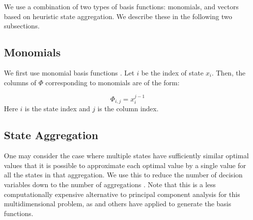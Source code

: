 \documentclass[conference]{IEEEtran}
\begin{document}
We use a combination of two types of basis functions: monomials, and vectors based on heuristic state aggregation. We describe these in the following two subsections.

\subsection{Monomials}
    We first use monomial basis functions \cite{bertsekas1995dynamic,478953}. Let $i$ be the index of state $x_{i}$. Then, the columns of $\Phi$ corresponding to monomials are of the form:
	
	\begin{displaymath}
        \Phi_{i,j}=x_{i}^{j-1}
    \end{displaymath} Here $i$ is the state index and $j$ is the column index. %



 \subsection{State Aggregation}
    
    One may consider the case where multiple states have sufficiently similar optimal values that it is possible to approximate each optimal value by a single value for all the states in that aggregation. We use this to reduce the number of decision variables down to the number of aggregations \cite{5717627}. Note that this is a less computationally expensive alternative to principal component analysis for this multidimensional problem, as \cite{PCA2015} and others have applied to generate the basis functions.%
    
\end{document}

